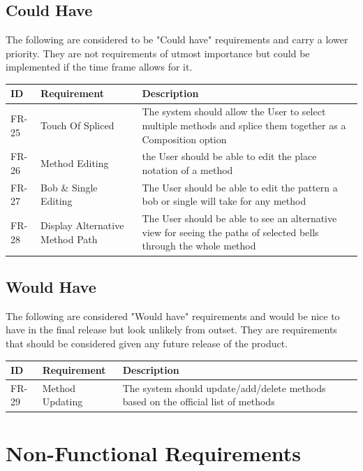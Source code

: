 \documentclass{l4proj}
\begin{document}
\subsection{Could Have}

The following are considered to be "Could have" requirements and carry a lower priority.  They are not requirements of utmost importance but could be implemented if the time frame allows for it.

\begin{tabular}{| l | p{4cm} | p{11cm} | }
\hline
\textbf{ID} & \textbf{Requirement} & \textbf{Description} \\
\hline
\hline
FR-25 & Touch Of Spliced & The system should allow the User to select multiple methods and splice them together as a Composition option\\
\hline
FR-26 & Method Editing & the User should be able to edit the place notation of a method\\
\hline
FR-27 & Bob \& Single Editing & The User should be able to edit the pattern a bob or single will take for any method\\
\hline
FR-28 & Display Alternative Method Path & The User should be able to see an alternative view for seeing the paths of selected bells through the whole method\\
\hline
\end{tabular}


\subsection{Would Have}

The following are considered "Would have" requirements and would be nice to have in the final release but look unlikely from outset. They are requirements that should be considered given any future release of the product.

\begin{tabular}{| l | p{4cm} | p{11cm} | }
\hline
\textbf{ID} & \textbf{Requirement} & \textbf{Description} \\
\hline
\hline
FR-29 & Method Updating & The system should update/add/delete methods based on the official list of methods\\
\hline
\end{tabular}

\section{Non-Functional Requirements}
\end{document}
